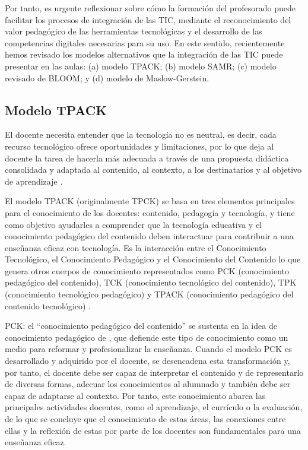 \documentclass[spanish]{textolivre}
\begin{document}
Por tanto, es urgente reflexionar sobre cómo la formación del profesorado puede facilitar los procesos de integración de las TIC, mediante el reconocimiento del valor pedagógico de las herramientas tecnológicas y el desarrollo de las competencias digitales necesarias para su uso. En este sentido, recientemente hemos revisado los modelos alternativos que la integración de las TIC puede presentar en las aulas: (a) modelo TPACK; (b) modelo SAMR; (c) modelo revisado de BLOOM; y (d) modelo de Maslow-Gerstein.

\subsection{Modelo TPACK}\label{sec-conduta}
El docente necesita entender que la tecnología no es neutral, es decir, cada recurso tecnológico ofrece oportunidades y limitaciones, por lo que deja al docente la tarea de hacerla más adecuada a través de una propuesta didáctica consolidada y adaptada al contenido, al contexto, a los destinatarios y al objetivo de aprendizaje \cite{koehler_what_2009}.

El modelo TPACK (originalmente TPCK) se basa en tres elementos principales para el conocimiento de los docentes: contenido, pedagogía y tecnología, y tiene como objetivo ayudarles a comprender que la tecnología educativa y el conocimiento pedagógico del contenido deben interactuar para contribuir a una enseñanza eficaz con tecnología. Es la interacción entre el Conocimiento Tecnológico, el Conocimiento Pedagógico y el Conocimiento del Contenido lo que genera otros cuerpos de conocimiento representados como PCK (conocimiento pedagógico del contenido), TCK (conocimiento tecnológico del contenido), TPK (conocimiento tecnológico pedagógico) y TPACK (conocimiento pedagógico del contenido tecnológico) \cite{Koehle_2014}. 

PCK: el “conocimiento pedagógico del contenido” se sustenta en la idea de conocimiento pedagógico de \textcite{shulman_knowledge_1987}, que defiende este tipo de conocimiento como un medio para reformar y profesionalizar la enseñanza. Cuando el modelo PCK es desarrollado y adquirido por el docente, se desencadena esta transformación y, por tanto, el docente debe ser capaz de interpretar el contenido y de representarlo de diversas formas, adecuar los conocimientos al alumnado y también debe ser capaz de adaptarse al contexto. Por tanto, este conocimiento abarca las principales actividades docentes, como el aprendizaje, el currículo o la evaluación, de lo que se concluye que el conocimiento de estas áreas, las conexiones entre ellas y la reflexión de estas por parte de los docentes son fundamentales para una enseñanza eficaz.
\end{document}
